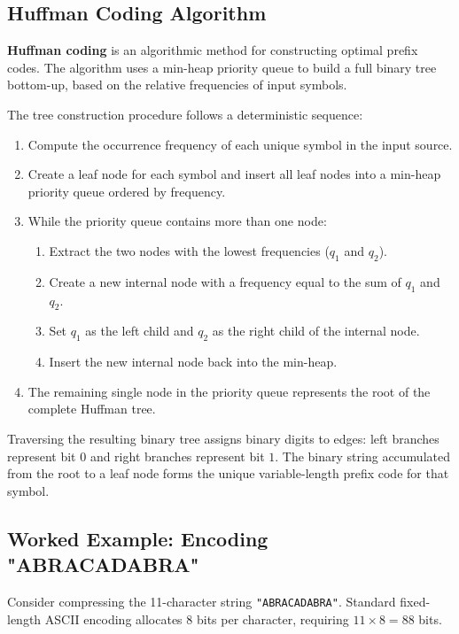 \documentclass[12pt]{report}
\begin{document}
\subsection{Huffman Coding Algorithm}

\textbf{Huffman coding} is an algorithmic method for constructing optimal prefix codes. The algorithm uses a min-heap priority queue to build a full binary tree bottom-up, based on the relative frequencies of input symbols.

The tree construction procedure follows a deterministic sequence:
\begin{enumerate}
    \item Compute the occurrence frequency of each unique symbol in the input source.
    \item Create a leaf node for each symbol and insert all leaf nodes into a min-heap priority queue ordered by frequency.
    \item While the priority queue contains more than one node:
    \begin{enumerate}
        \item Extract the two nodes with the lowest frequencies ($q_1$ and $q_2$).
        \item Create a new internal node with a frequency equal to the sum of $q_1$ and $q_2$.
        \item Set $q_1$ as the left child and $q_2$ as the right child of the internal node.
        \item Insert the new internal node back into the min-heap.
    \end{enumerate}
    \item The remaining single node in the priority queue represents the root of the complete Huffman tree.
\end{enumerate}

Traversing the resulting binary tree assigns binary digits to edges: left branches represent bit $0$ and right branches represent bit $1$. The binary string accumulated from the root to a leaf node forms the unique variable-length prefix code for that symbol.

\subsection{Worked Example: Encoding "ABRACADABRA"}

Consider compressing the 11-character string \texttt{"ABRACADABRA"}. Standard fixed-length ASCII encoding allocates 8 bits per character, requiring $11 \times 8 = 88$ bits.
\end{document}
